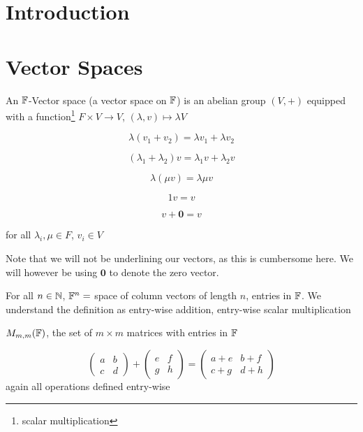 \documentclass[a4paper]{article}
\begin{document}
\maketitle

\setcounter{section}{-1}
\section{Introduction}



\section{Vector Spaces}

\begin{defi}
	An $ \mathbb{F} $-Vector space (a vector space on $ \mathbb{F} $) is an abelian group $ (V, +) $ equipped with a function\footnote{scalar multiplication} $ F \times V \to V $, $ (\lambda,v) \mapsto \lambda V $
	
	\[ \lambda ( v_{1} + v_{2}) = \lambda v_{1} + \lambda v_{2} \]
	
	\[ (\lambda_{1} + \lambda_{2}) v = \lambda_{1} v + \lambda_{2} v \]
	
	\[ \lambda (\mu v) = \lambda \mu v \]
	
	\[ 1v = v \]
	
	\[ v + \mathbf{0} = v \]
	
	for all $ \lambda_{i}, \mu \in F $, $ v_{i} \in V $
	
\end{defi}

Note that we will not be underlining our vectors, as this is cumbersome here. We will however be using $ \mathbf{0} $ to denote the zero vector. 

\begin{eg}
	For all $ n \in \mathbb{N}  $, $ \mathbb{F}^{n} = $ space of column vectors of length $ n $, entries in $ \mathbb{F} $. We understand the definition as entry-wise addition, entry-wise scalar multiplication
	  
\end{eg}


\begin{eg}
	$ M_{m,m}(\mathbb{F}) $, the set of $ m \times m $ matrices with entries in $ \mathbb{F} $
	
	\[ \begin{pmatrix}
	a & b \\
	c & d
	\end{pmatrix} + \begin{pmatrix}
	e & f \\
	g & h
	\end{pmatrix} = \begin{pmatrix}
	a + e & b + f\\
	c + g & d + h
	\end{pmatrix} \]
	again all operations defined entry-wise
\end{eg}
\end{document}
